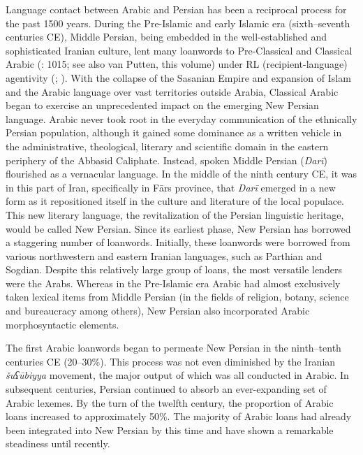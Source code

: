\documentclass[output=paper]{langsci/langscibook}
\begin{document}
Language contact between Arabic and Persian has been a reciprocal process for the past 1500 years. During the Pre-Islamic and early Islamic era (sixth–seventh centuries CE), Middle Persian, being embedded in the well-established and sophisticated Iranian culture, lent many loanwords to Pre-Classical and Classical Arabic (\citealt{Gaszi2011}: 1015; see also van Putten, this volume) under RL (recipient-language) agentivity (\citealt{Coetsem1988}; \citealt{Coetsem2000}). With the collapse of the Sasanian Empire and expansion of Islam and the Arabic language over vast territories outside Arabia, Classical Arabic began to exercise an unprecedented impact on the emerging New Persian language. Arabic never took root in the everyday communication of the ethnically Persian population, although it gained some dominance as a written vehicle in the administrative, theological, literary and scientific domain in the eastern periphery of the Abbasid Caliphate. Instead, spoken Middle Persian (\textit{Darī}) flourished as a vernacular language. In the middle of the ninth century CE, it was in this part of Iran, specifically in Fārs province, that \textit{Darī} emerged in a new form as it repositioned itself in the culture and literature of the local populace. This new literary language, the revitalization of the Persian linguistic heritage, would be called New Persian. Since its earliest phase, New Persian has borrowed a staggering number of loanwords. Initially, these loanwords were borrowed from various northwestern and eastern Iranian languages, such as Parthian and Sogdian. Despite this relatively large group of loans, the most versatile lenders were the Arabs. Whereas in the Pre-Islamic era Arabic had almost exclusively taken lexical items from Middle Persian (in the fields of religion, botany, science and bureaucracy among others), New Persian also incorporated Arabic morphosyntactic elements.

The first Arabic loanwords began to permeate New Persian in the ninth–tenth centuries CE (20–30\%). This process was not even diminished by the Iranian \textit{šuʕūbiyya} movement, the major output of which was all conducted in Arabic. In subsequent centuries, Persian continued to absorb an ever-expanding set of Arabic lexemes. By the turn of the twelfth century, the proportion of Arabic loans increased to approximately 50\%. The majority of Arabic loans had already been integrated into New Persian by this time and have shown a remarkable steadiness until recently.
\end{document}
